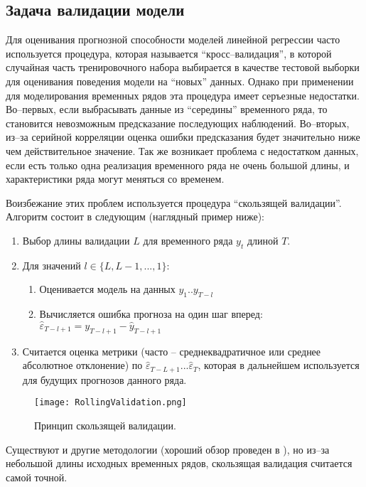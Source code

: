 \documentclass[a4paper,14pt]{extreport}
\begin{document}
	\subsection{Задача валидации модели}
	
	Для оценивания прогнозной способности моделей линейной регрессии часто используется процедура, которая называется ``кросс–валидация'', в которой случайная часть тренировочного набора выбирается в качестве тестовой выборки для оценивания поведения модели на ``новых'' данных. Однако при применении для моделирования временных рядов эта процедура имеет серъезные недостатки. Во–первых, если выбрасывать данные из ``середины'' временного ряда, то становится невозможным предсказание последующих наблюдений. Во–вторых, из–за серийной корреляции оценка ошибки предсказания будет значительно ниже чем действительное значение. Так же возникает проблема с недостатком данных, если есть только одна реализация временного ряда не очень большой длины, и характеристики ряда могут меняться со временем.
	
	Воизбежание этих проблем используется процедура ``скользящей валидации''. Алгоритм состоит в следующим (наглядный пример ниже):
	\begin{enumerate}
		\item Выбор длины валидации $L$ для временного ряда  $y_t$ длиной $T$.
		\item Для значений $l \in \{L, L-1, ..., 1\}$:
		\begin{enumerate}
			\item Оценивается модель на данных $y_1..y_{T-l}$
			\item Вычисляется ошибка прогноза на один шаг вперед: 
			$\hat{\varepsilon}_{T-l+1} = y_{T-l+1} - \hat{y}_{T-l+1}$
		\end{enumerate}
		\item Считается оценка метрики (часто – среднеквадратичное или среднее абсолютное отклонение) по $\hat{\varepsilon}_{T-L+1} ... \hat{\varepsilon}_{T}$, которая в дальнейшем используется для будущих прогнозов данного ряда.
	\end{enumerate}
	
	\begin{figure}
		\texttt{[image: RollingValidation.png]}
		\caption{Принцип скользящей валидации.}
		\label{fig:rolling_validation}
	\end{figure}
	
	Существуют и другие методологии (хороший обзор проведен в \cite{hyndCV}), но из–за небольшой длины исходных временных рядов, скользящая валидация считается самой точной.
	
\end{document}
